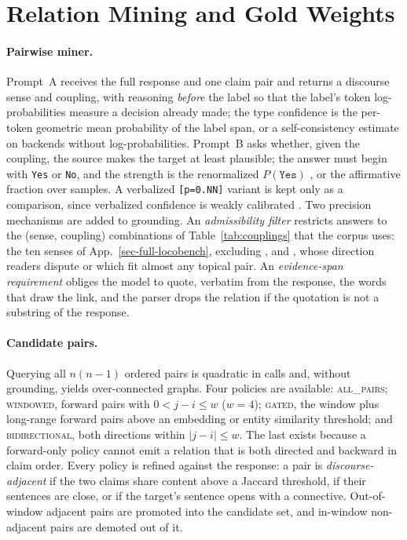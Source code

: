 \section{Relation Mining and Gold Weights}
\label{app:estimation}

\paragraph{Pairwise miner.} Prompt~A receives the full response and one claim pair and returns a
discourse sense and coupling, with reasoning \emph{before} the label so that the label's token
log-probabilities measure a decision already made; the type confidence is the per-token geometric
mean probability of the label span, or a self-consistency estimate
\citep{simbauq} on backends without log-probabilities. Prompt~B asks whether, given the coupling,
the source makes the target at least plausible; the answer must begin with \texttt{Yes} or
\texttt{No}, and the strength is the renormalized $P(\texttt{Yes})$ \citep{kadavath}, or the
affirmative fraction over samples. A verbalized \texttt{[p=0.NN]} variant is kept only as a
comparison, since verbalized confidence is weakly calibrated \citep{xiong}. Two precision
mechanisms are added to grounding. An \emph{admissibility filter} restricts answers to the
(sense, coupling) combinations of Table~\ref{tab:couplings} that the corpus uses: the ten senses
of App.~\ref{sec-full-locobench}, excluding ,  and
, whose direction readers dispute or which fit almost any topical pair. An
\emph{evidence-span requirement} obliges the model to quote, verbatim from the response, the words
that draw the link, and the parser drops the relation if the quotation is not a substring of the
response.

\paragraph{Candidate pairs.} Querying all $n(n-1)$ ordered pairs is quadratic in calls and, without
grounding, yields over-connected graphs. Four policies are available: \textsc{all\_pairs};
\textsc{windowed}, forward pairs with $0<j-i\le w$ ($w=4$); \textsc{gated}, the window plus
long-range forward pairs above an embedding or entity similarity threshold; and
\textsc{bidirectional}, both directions within $|j-i|\le w$. The last exists because a forward-only
policy cannot emit a relation that is both directed and backward in claim order. Every policy is
refined against the response: a pair is \emph{discourse-adjacent} if the two claims share content
above a Jaccard threshold, if their sentences are close, or if the target's sentence opens with a
connective. Out-of-window adjacent pairs are promoted into the candidate set, and in-window
non-adjacent pairs are demoted out of it.

